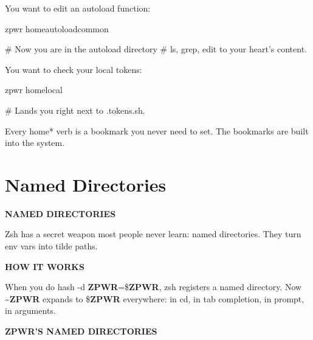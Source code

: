 \documentclass[11pt,a4paper,twoside]{book}
\begin{document}
You want to edit an autoload function:

\begin{codebox}
\color{neongreen}zpwr homeautoloadcommon\\
\end{codebox}

\# Now you are in the autoload directory \# ls, grep, edit to your heart's content.

You want to check your local tokens:

\begin{codebox}
\color{neongreen}zpwr homelocal\\
\end{codebox}

\# Lands you right next to .tokens.sh.

Every home* verb is a bookmark you never need to set. The bookmarks are built into the system.


\vspace{16pt}

\section{Named Directories}


\vspace{10pt}
{\large\bfseries\color{neoncyan} NAMED DIRECTORIES}\vspace{6pt}

Zsh has a secret weapon most people never learn: named directories. They turn env vars into tilde paths.


\vspace{12pt}
{\bfseries\color{neonyellow} HOW IT WORKS}\vspace{4pt}

When you do hash -d \textbf{ZPWR}=\$\textbf{ZPWR}, zsh registers a named directory. Now \textasciitilde{}\textbf{ZPWR} expands to \$\textbf{ZPWR} everywhere: in cd, in tab completion, in prompt, in arguments.


\vspace{12pt}
{\bfseries\color{neonyellow} \textbf{ZPWR}'S NAMED DIRECTORIES}\vspace{4pt}
\end{document}
